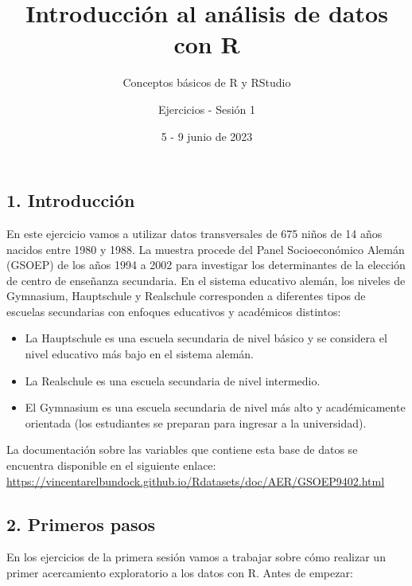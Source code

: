 \documentclass[
]{article}
\title{Introducción al análisis de datos con R}
\subtitle{Conceptos básicos de R y RStudio}
\author{Ejercicios - Sesión 1}
\date{5 - 9 junio de 2023}
\begin{document}
\maketitle

\hypertarget{introducciuxf3n}{%
\subsection{1. Introducción}\label{introducciuxf3n}}

En este ejercicio vamos a utilizar datos transversales de 675 niños de
14 años nacidos entre 1980 y 1988. La muestra procede del Panel
Socioeconómico Alemán (GSOEP) de los años 1994 a 2002 para investigar
los determinantes de la elección de centro de enseñanza secundaria. En
el sistema educativo alemán, los niveles de Gymnasium, Hauptschule y
Realschule corresponden a diferentes tipos de escuelas secundarias con
enfoques educativos y académicos distintos:

\begin{itemize}
\item
  La Hauptschule es una escuela secundaria de nivel básico y se
  considera el nivel educativo más bajo en el sistema alemán.
\item
  La Realschule es una escuela secundaria de nivel intermedio.
\item
  El Gymnasium es una escuela secundaria de nivel más alto y
  académicamente orientada (los estudiantes se preparan para ingresar a
  la universidad).
\end{itemize}

La documentación sobre las variables que contiene esta base de datos se
encuentra disponible en el siguiente enlace:
\url{https://vincentarelbundock.github.io/Rdatasets/doc/AER/GSOEP9402.html}

\hypertarget{primeros-pasos}{%
\subsection{2. Primeros pasos}\label{primeros-pasos}}

En los ejercicios de la primera sesión vamos a trabajar sobre cómo
realizar un primer acercamiento exploratorio a los datos con R. Antes de
empezar:
\end{document}
